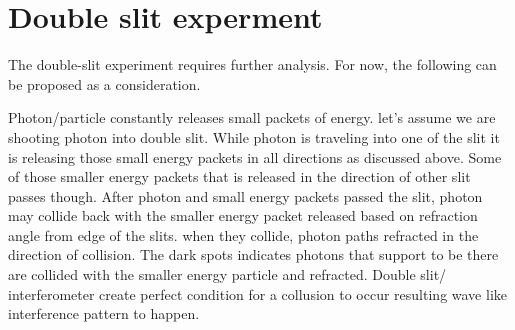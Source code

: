 \documentclass{article}
\begin{document}
    \section{Double slit experment ~\cite{Young1802}}
    
	The double-slit experiment requires further analysis. For now, the following can be proposed as a consideration.
    

    Photon/particle constantly releases small packets of energy.
    let's assume we are shooting photon into double slit.
    While photon is traveling into one of the slit it is releasing those small energy packets in all directions as discussed above.
     Some of those smaller energy packets that is released in the direction of other slit  passes though.
     After photon and small energy packets passed the slit, photon may collide back with the smaller energy packet released based on refraction angle from edge of the slits.
     when they collide, photon paths refracted in the direction of collision.
     The dark spots indicates photons that support to be there are collided with the smaller energy particle and refracted.
     Double slit/ interferometer create perfect condition for a collusion to occur resulting wave like interference pattern to happen.

    \newpage

    
    
\end{document}
